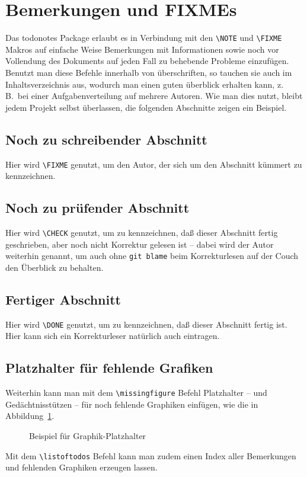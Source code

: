 \section{Bemerkungen und FIXMEs}
\label{sec:todo}
Das \textsf{todonotes} Package erlaubt es in Verbindung mit den \verb|\NOTE|
und \verb|\FIXME| Makros auf einfache Weise Bemerkungen
mit Informationen sowie noch vor Vollendung des Dokuments auf jeden Fall zu
behebende Probleme einzufügen.
Benutzt man diese Befehle innerhalb von überschriften, so tauchen sie auch
im Inhaltsverzeichnis aus, wodurch man einen guten überblick erhalten kann,
z.\,B.\ bei einer Aufgabenverteilung auf mehrere Autoren.
Wie man dies nutzt, bleibt jedem Projekt selbst überlassen, die folgenden
Abschnitte zeigen ein Beispiel.

\subsection{Noch zu schreibender Abschnitt}
Hier wird \verb|\FIXME| genutzt, um den Autor, der sich um den Abschnitt
kümmert zu kennzeichnen.

\subsection{Noch zu prüfender Abschnitt}
Hier wird \verb|\CHECK| genutzt, um zu kennzeichnen, daß dieser Abschnitt
fertig geschrieben, aber noch nicht Korrektur gelesen ist -- dabei wird der
Autor weiterhin genannt, um auch ohne \texttt{git blame} beim Korrekturlesen
auf der Couch den Überblick zu behalten. 

\subsection{Fertiger Abschnitt}
Hier wird \verb|\DONE| genutzt, um zu kennzeichnen, daß dieser Abschnitt
fertig ist.
Hier kann sich ein Korrekturleser natürlich auch eintragen.

\subsection{Platzhalter für fehlende Grafiken}
Weiterhin kann man mit dem \verb|\missingfigure| Befehl Platzhalter -- und
Gedächtnisstützen -- für noch fehlende Graphiken einfügen, wie die in
Abbildung~\ref{fig:missingfigure-example}.

\begin{figure}[ht]
  \caption{Beispiel für Graphik-Platzhalter}
  \label{fig:missingfigure-example}
\end{figure}

Mit dem \verb|\listoftodos| Befehl kann man zudem einen Index aller
Bemerkungen und fehlenden Graphiken erzeugen lassen.
